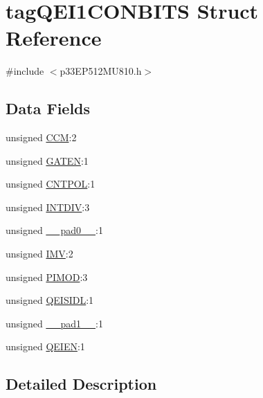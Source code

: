 \hypertarget{structtag_q_e_i1_c_o_n_b_i_t_s}{}\section{tag\+Q\+E\+I1\+C\+O\+N\+B\+I\+TS Struct Reference}
\label{structtag_q_e_i1_c_o_n_b_i_t_s}


{\ttfamily \#include $<$p33\+E\+P512\+M\+U810.\+h$>$}

\subsection*{Data Fields}
\begin{DoxyCompactItemize}
\item 
unsigned \hyperlink{structtag_q_e_i1_c_o_n_b_i_t_s_ab8c998ed01259b6b6e47cc3b54c675f3}{C\+CM}\+:2
\item 
unsigned \hyperlink{structtag_q_e_i1_c_o_n_b_i_t_s_af24e686dc228d3da43508aa11b6c5eb2}{G\+A\+T\+EN}\+:1
\item 
unsigned \hyperlink{structtag_q_e_i1_c_o_n_b_i_t_s_aebfda84f41fa40e6899eeeb3c795d50b}{C\+N\+T\+P\+OL}\+:1
\item 
unsigned \hyperlink{structtag_q_e_i1_c_o_n_b_i_t_s_ab4c7f4a9e9d2824b54be89a9798d6e39}{I\+N\+T\+D\+IV}\+:3
\item 
unsigned \hyperlink{structtag_q_e_i1_c_o_n_b_i_t_s_adf71f3d8410c1f1dbbc96680a92c49af}{\+\_\+\+\_\+pad0\+\_\+\+\_\+}\+:1
\item 
unsigned \hyperlink{structtag_q_e_i1_c_o_n_b_i_t_s_a38f7c055f4c40e952c25d8b0fdb691a8}{I\+MV}\+:2
\item 
unsigned \hyperlink{structtag_q_e_i1_c_o_n_b_i_t_s_adcfde04c51defc9d36ec58e4c15cc28e}{P\+I\+M\+OD}\+:3
\item 
unsigned \hyperlink{structtag_q_e_i1_c_o_n_b_i_t_s_adf814839ec245aa961a874d878c37329}{Q\+E\+I\+S\+I\+DL}\+:1
\item 
unsigned \hyperlink{structtag_q_e_i1_c_o_n_b_i_t_s_acaf2d0924a107ec6e8d2e31febaf66f9}{\+\_\+\+\_\+pad1\+\_\+\+\_\+}\+:1
\item 
unsigned \hyperlink{structtag_q_e_i1_c_o_n_b_i_t_s_ad84b7ff5d720a8a5a8c3c04b9ffc346b}{Q\+E\+I\+EN}\+:1
\end{DoxyCompactItemize}


\subsection{Detailed Description}


